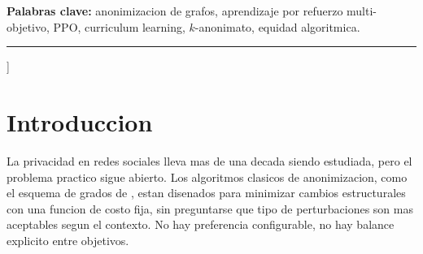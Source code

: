 \documentclass[10pt,twocolumn,letterpaper]{article}
\newcommand{\moppo}{\textsc{moppo}}
\begin{document}
{\begin{@twocolumnfalse}
\begin{abstract}
Anonimizar una red social sin destruir su estructura es un problema de optimizacion
con dos objetivos que se oponen: mientras mas privado queda el grafo, mas se aleja de
su topologia original. Nosotros formulamos esto como un problema de aprendizaje por
refuerzo multi-objetivo (MORL) y entrenamos un agente PPO condicionado por pesos para
navegar ese balance de manera adaptativa. El resultado es \moppo{}, un framework que
aprende politicas para cualquier preferencia privacidad/utilidad con un solo modelo,
en lugar de entrenar uno diferente por cada punto del frente de Pareto. Introducimos
dos contribuciones tecnicas: \emph{action masking} basado en deficit de $k$-anonimato,
que reduce el espacio efectivo de acciones entre $25\times$ y $45\times$, y un
curriculum en tres fases que resuelve la inestabilidad de gradientes contrapuestos en
el entrenamiento temprano. Evaluamos sobre el grafo de karate club ($k=2$, $k=4$) y
un subgrafo de ego de Facebook con 100 nodos, alcanzando hipervolumenes de 0.973,
0.388 y 0.897 respectivamente. Ademas documentamos un sesgo de equidad sistematico:
los nodos perifericos absorben entre $2.1\times$ y $3.9\times$ mas impacto relativo
que los hubs durante la anonimizacion, independientemente del valor de~$\alpha$.
\end{abstract}

\vspace{4pt}
\noindent\textbf{Palabras clave:} anonimizacion de grafos,
aprendizaje por refuerzo multi-objetivo, PPO, curriculum learning,
$k$-anonimato, equidad algoritmica.

\vspace{4pt}
\noindent\rule{\linewidth}{0.4pt}
\vspace{8pt}

\end{@twocolumnfalse}
}]

\section{Introduccion}

La privacidad en redes sociales lleva mas de una decada siendo estudiada, pero el
problema practico sigue abierto. Los algoritmos clasicos de anonimizacion, como el
esquema de grados de \citet{liu2008towards}, estan disenados para minimizar cambios
estructurales con una funcion de costo fija, sin preguntarse que tipo de perturbaciones
son mas aceptables segun el contexto. No hay preferencia configurable, no hay balance
explicito entre objetivos.
\end{document}
